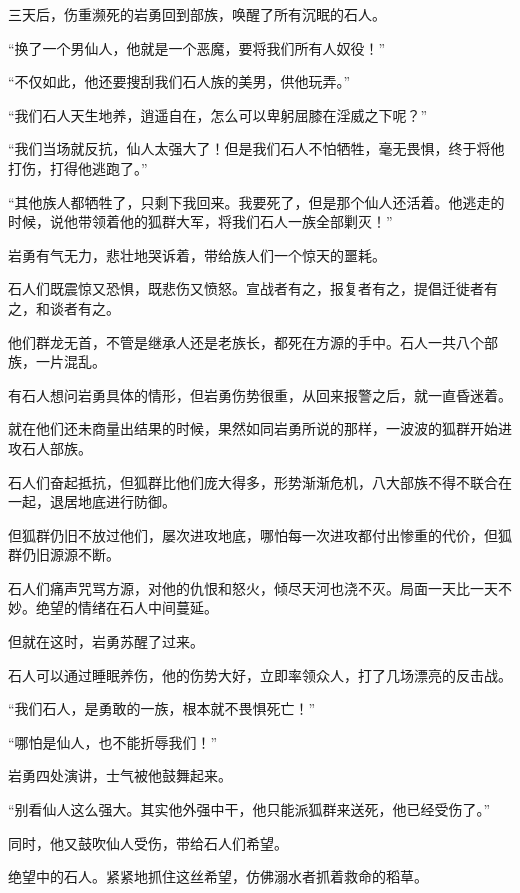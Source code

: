 
\begin{this_body}



三天后，伤重濒死的岩勇回到部族，唤醒了所有沉眠的石人。

“换了一个男仙人，他就是一个恶魔，要将我们所有人奴役！”

“不仅如此，他还要搜刮我们石人族的美男，供他玩弄。”

“我们石人天生地养，逍遥自在，怎么可以卑躬屈膝在淫威之下呢？”

“我们当场就反抗，仙人太强大了！但是我们石人不怕牺牲，毫无畏惧，终于将他打伤，打得他逃跑了。”

“其他族人都牺牲了，只剩下我回来。我要死了，但是那个仙人还活着。他逃走的时候，说他带领着他的狐群大军，将我们石人一族全部剿灭！”

岩勇有气无力，悲壮地哭诉着，带给族人们一个惊天的噩耗。

石人们既震惊又恐惧，既悲伤又愤怒。宣战者有之，报复者有之，提倡迁徙者有之，和谈者有之。

他们群龙无首，不管是继承人还是老族长，都死在方源的手中。石人一共八个部族，一片混乱。

有石人想问岩勇具体的情形，但岩勇伤势很重，从回来报警之后，就一直昏迷着。

就在他们还未商量出结果的时候，果然如同岩勇所说的那样，一波波的狐群开始进攻石人部族。

石人们奋起抵抗，但狐群比他们庞大得多，形势渐渐危机，八大部族不得不联合在一起，退居地底进行防御。

但狐群仍旧不放过他们，屡次进攻地底，哪怕每一次进攻都付出惨重的代价，但狐群仍旧源源不断。

石人们痛声咒骂方源，对他的仇恨和怒火，倾尽天河也浇不灭。局面一天比一天不妙。绝望的情绪在石人中间蔓延。

但就在这时，岩勇苏醒了过来。

石人可以通过睡眠养伤，他的伤势大好，立即率领众人，打了几场漂亮的反击战。

“我们石人，是勇敢的一族，根本就不畏惧死亡！”

“哪怕是仙人，也不能折辱我们！”

岩勇四处演讲，士气被他鼓舞起来。

“别看仙人这么强大。其实他外强中干，他只能派狐群来送死，他已经受伤了。”

同时，他又鼓吹仙人受伤，带给石人们希望。

绝望中的石人。紧紧地抓住这丝希望，仿佛溺水者抓着救命的稻草。


\end{this_body}
